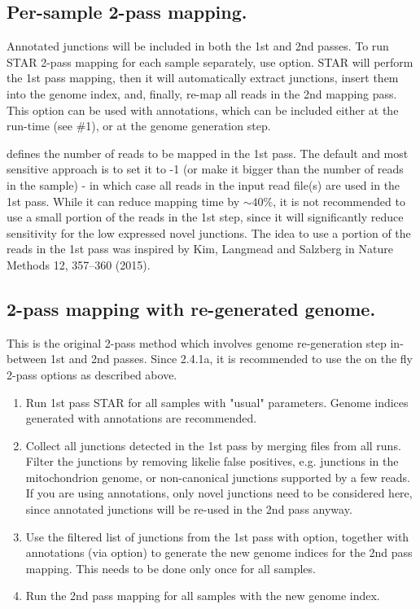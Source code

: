 \documentclass[12pt]{article}
\begin{document}
\subsection{Per-sample 2-pass mapping.}

Annotated junctions will be included in both the 1st and 2nd passes.
To run STAR 2-pass mapping for each sample separately, use   option. STAR will perform the 1st pass mapping, then it will automatically extract junctions, insert them into the genome index, and, finally, re-map all reads in the 2nd mapping pass. This option can be used with annotations, which can be included either at the run-time (see \#1), or at the genome generation step.

 defines the number of reads to be mapped in the 1st pass. The default and most sensitive approach is to set it to -1 (or make it bigger than the number of reads in the sample) - in which case all reads in the input read file(s) are used in the 1st pass. While it can reduce mapping time by $\sim40\%$, it is not recommended to use a small portion of the reads in the 1st step, since it will significantly reduce sensitivity for the low expressed novel junctions. The idea to use a portion of the reads in the 1st pass was inspired by Kim, Langmead and Salzberg in Nature Methods 12, 357–360 (2015).

\subsection{2-pass mapping with re-generated genome.}
This is the original 2-pass method which involves genome re-generation step in-between 1st and 2nd passes. Since 2.4.1a, it is recommended to use the on the fly 2-pass options as described above.
\begin{enumerate}
\item Run 1st pass STAR for all samples with "usual" parameters. Genome indices generated with annotations are recommended.
\item Collect all junctions detected in the 1st pass by merging  files from all runs. Filter the junctions by removing likelie false positives, e.g. junctions in the mitochondrion genome, or non-canonical junctions supported by a few reads. If you are using annotations, only novel junctions need to be considered here, since annotated junctions will be re-used in the 2nd pass anyway.
\item Use the filtered list of junctions from the 1st pass with  option, together with annotations (via  option) to generate the new genome indices for the 2nd pass mapping. This needs to be done only once for all samples.
\item Run the 2nd pass mapping for all samples with the new genome index.
\end{enumerate}
\end{document}
